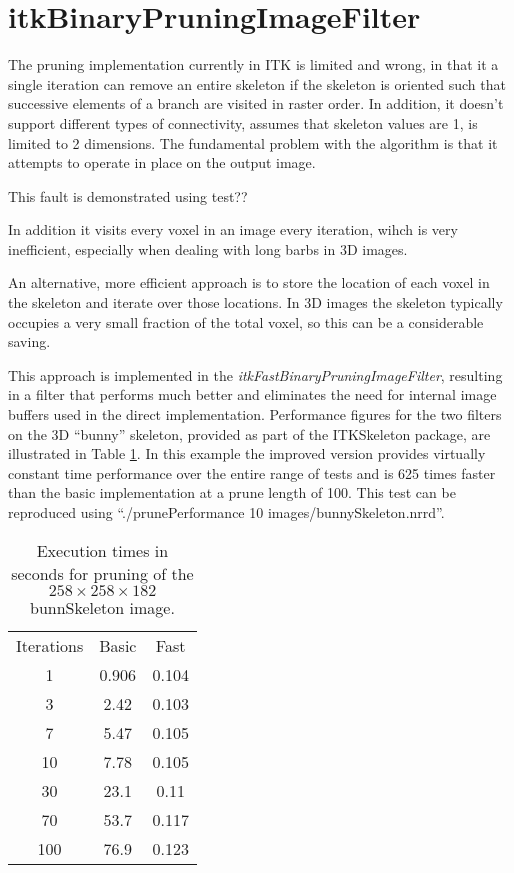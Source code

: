 \documentclass{InsightArticle}
\begin{document}
\section{itkBinaryPruningImageFilter}
The pruning implementation currently in ITK is limited and wrong, in
that it a single iteration can remove an entire skeleton if the
skeleton is oriented such that successive elements of a branch are
visited in raster order. In addition, it doesn't support different
types of connectivity, assumes that skeleton values are 1, is limited
to 2 dimensions. The fundamental problem with the algorithm is that it
attempts to operate in place on the output image.

This fault is demonstrated using test??

In addition it visits every voxel in an image every iteration, wihch
is very inefficient, especially when dealing with long barbs in 3D
images.

An alternative, more efficient approach is to store the location of
each voxel in the skeleton and iterate over those locations. In 3D
images the skeleton typically occupies a very small fraction of the
total voxel, so this can be a considerable saving.

This approach is implemented in the {\em
  itkFastBinaryPruningImageFilter}, resulting in a filter that
performs much better and eliminates the need for internal image
buffers used in the direct implementation. Performance figures for the
two filters on the 3D ``bunny'' skeleton, provided as part of the
ITKSkeleton package, are illustrated in Table
\ref{tbl:pruneperformance}. In this example the improved version
provides virtually constant time performance over the entire range of
tests and is 625 times faster than the basic implementation at a prune
length of 100. This test can be reproduced using ``./prunePerformance 10 images/bunnySkeleton.nrrd''.

\begin{table}[phtb]
\centering
\small
\begin{tabular}{ccc}
\hline
Iterations & Basic  & Fast \\
1  &     0.906  & 0.104  \\
3  &     2.42   & 0.103  \\
7  &     5.47   & 0.105  \\
10 &     7.78   & 0.105  \\
30 &     23.1   & 0.11  \\
70  &    53.7   & 0.117  \\
100  &   76.9   & 0.123  \\
\hline
\end{tabular}
\caption{Execution times in seconds for pruning of the $258 \times 258 \times 182$ bunnSkeleton image. \label{tbl:pruneperformance}}
\end{table}
\end{document}
